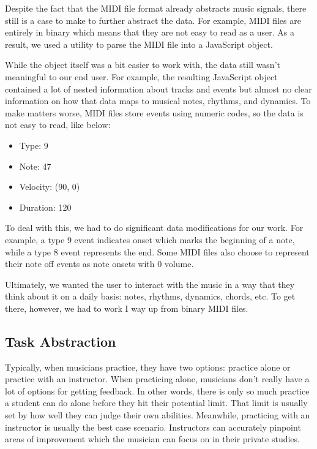 \documentclass[journal]{vgtc}                %
\begin{document}
Despite the fact that the MIDI file format already abstracts music signals,
there still is a case to make to further abstract the data. For example,
MIDI files are entirely in binary which means that they are not easy to read
as a user. As a result, we used a utility to parse the MIDI file into a
JavaScript object.

While the object itself was a bit easier to work with, the data still wasn't
meaningful to our end user. For example, the resulting JavaScript object
contained a lot of nested information about tracks and events but almost no
clear information on how that data maps to musical notes, rhythms, and dynamics.
To make matters worse, MIDI files store events using numeric codes, so the
data is not easy to read, like below:

\begin{itemize}
  \item Type: 9
  \item Note: 47
  \item Velocity: (90, 0)
  \item Duration: 120
\end{itemize}

To deal with this, we had to do significant data modifications for our work.
For example, a type 9 event indicates onset which marks the beginning of a note, while a type 8 event represents the end.
Some MIDI files also choose to represent their note off events as note onsets with 0 volume.

Ultimately, we wanted the user to interact with the music in a way that they
think about it on a daily basis: notes, rhythms, dynamics, chords, etc. To get
there, however, we had to work I way up from binary MIDI files.

\subsection{Task Abstraction}

Typically, when musicians practice, they have two options: practice alone or
practice with an instructor. When practicing alone, musicians don't really have
a lot of options for getting feedback. In other words, there is only so much
practice a student can do alone before they hit their potential limit. That
limit is usually set by how well they can judge their own abilities. Meanwhile,
practicing with an instructor is usually the best case scenario. Instructors can
accurately pinpoint areas of improvement which the musician can focus on in their
private studies.
\end{document}
